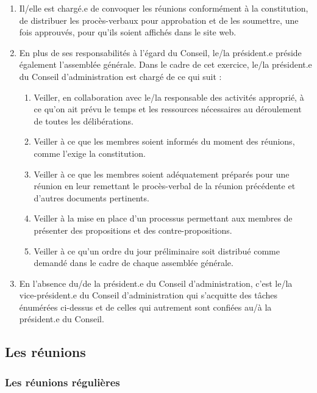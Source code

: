 \begin{enumerate}
 \item
  Il/elle est chargé.e de convoquer les réunions conformément à la constitution, de distribuer les procès-verbaux pour approbation et de les soumettre, une fois approuvés, pour qu'ils soient affichés dans le site web.
 \item
  En plus de ses responsabilités à l'égard du Conseil, le/la président.e préside également l'assemblée générale. Dans le cadre de cet exercice, le/la président.e du Conseil d'administration est chargé de ce qui suit :

  \begin{enumerate}
   \item
    Veiller, en collaboration avec le/la responsable des activités approprié, à ce qu'on ait prévu le temps et les ressources nécessaires au déroulement de toutes les délibérations.
   \item
    Veiller à ce que les membres soient informés du moment des réunions, comme l'exige la constitution.
   \item
    Veiller à ce que les membres soient adéquatement préparés pour une réunion en leur remettant le procès-verbal de la réunion précédente et d'autres documents pertinents.
   \item
    Veiller à la mise en place d'un processus permettant aux membres de présenter des propositions et des contre-propositions.
   \item
    Veiller à ce qu'un ordre du jour préliminaire soit distribué comme demandé dans le cadre de chaque assemblée générale.
  \end{enumerate}
 \item
  En l'absence du/de la président.e du Conseil d'administration, c'est le/la vice-président.e du Conseil d'administration qui s'acquitte des tâches énumérées ci-dessus et de celles qui autrement sont confiées au/à la président.e du Conseil.
\end{enumerate}

\subsection{Les réunions}
\label{les-reunions}

\subsubsection{Les réunions régulières}
\label{les-reunions-regulieres}

